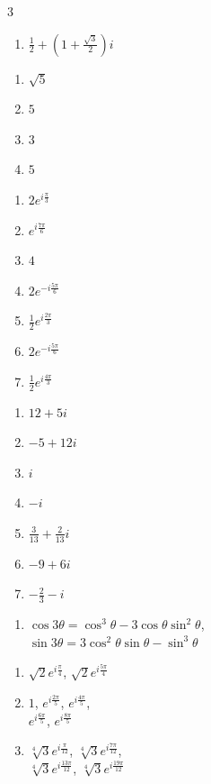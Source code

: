 \documentclass[a4paper,norsk,12pt]{article}
\begin{document}
\begin{appendix}
\begin{multicols}{3}
\begin{enumerate}[label=5\alph*)]
\item $\frac12 + \left(1+\frac{\sqrt{3}}{2}\right)i$
\end{enumerate}
\vspace{6pt}
\begin{enumerate}[label=6\alph*)]
\item $\sqrt{5}$
\item $5$
\item $3$
\item $5$
\end{enumerate}
\vspace{6pt}
\begin{enumerate}[label=7\alph*)]
\item $2e^{i\frac{\pi}{3}}$
\item $e^{i\frac{7\pi}{6}}$
\item $4$
\item $2e^{-i\frac{5\pi}{6}}$
\item $\frac12e^{i\frac{2\pi}{3}}$
\item $2e^{-i\frac{5\pi}{6}}$
\item $\frac12 e^{i\frac{4\pi}{3}}$
\end{enumerate}
\vspace{6pt}
\begin{enumerate}[label=8\alph*)]
\item $12+5i$
\item $-5+12i$
\item $i$
\item $-i$
\item $\frac{3}{13}+\frac{2}{13}i$
\item $-9+6i$
\item $-\frac23-i$
\end{enumerate}
\vspace{6pt}
\begin{enumerate}[label=9)]
\item
$\cos3\theta = \cos^3\theta - 3\cos\theta\sin^2\theta$, \\
$\sin3\theta = 3\cos^2\theta\sin\theta-\sin^3\theta$
\end{enumerate}
\vspace{6pt}
\begin{enumerate}[label=10\alph*)]
\item $\sqrt{2}e^{i\frac{\pi}{4}}$, $\sqrt{2}e^{i\frac{5\pi}{4}}$
\item $1$, $e^{i\frac{2\pi}{5}}$, $e^{i\frac{4\pi}{5}}$,\\ $e^{i\frac{6\pi}{5}}$, $e^{i\frac{8\pi}{5}}$
\item $\sqrt[4]{3}e^{i\frac{\pi}{12}}$, $\sqrt[4]{3}e^{i\frac{7\pi}{12}}$, \\$\sqrt[4]{3}e^{i\frac{13\pi}{12}}$, $\sqrt[4]{3}e^{i\frac{19\pi}{12}}$

\end{enumerate}
\end{multicols}
\end{appendix}
\end{document}
